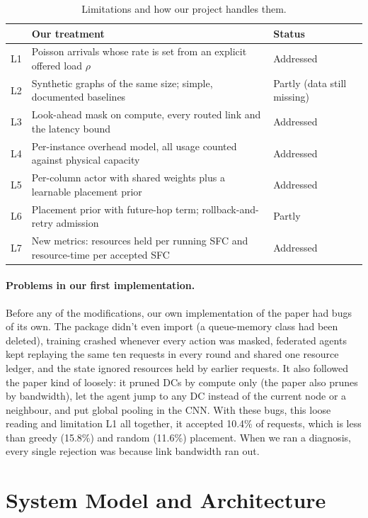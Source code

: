 \documentclass[11pt,a4paper]{article}
\newcommand{\ours}[1]{\textcolor[HTML]{1B7F5A}{#1}}
\begin{document}
\begin{table}[H]
\centering\small
\caption{Limitations and how our project handles them.}
\label{tab:limits}
\begin{tabularx}{\linewidth}{l X l}
\toprule
 & Our treatment & Status \\
\midrule
L1 & Poisson arrivals whose rate is set from an explicit offered load $\rho$ & \ours{Addressed} \\
L2 & Synthetic graphs of the same size; simple, documented baselines & Partly (data still missing) \\
L3 & Look-ahead mask on compute, every routed link and the latency bound & \ours{Addressed} \\
L4 & Per-instance overhead model, all usage counted against physical capacity & \ours{Addressed} \\
L5 & Per-column actor with shared weights plus a learnable placement prior & \ours{Addressed} \\
L6 & Placement prior with future-hop term; rollback-and-retry admission & Partly \\
L7 & New metrics: resources held per running SFC and resource-time per accepted SFC & \ours{Addressed} \\
\bottomrule
\end{tabularx}
\end{table}

\paragraph{Problems in our first implementation.} Before any of the
modifications, our own implementation of the paper had bugs of its own. The
package didn't even import (a queue-memory class had been deleted), training
crashed whenever every action was masked, federated agents kept replaying the
same ten requests in every round and shared one resource ledger, and the state
ignored resources held by earlier requests. It also followed the paper kind of
loosely: it pruned DCs by compute only (the paper also prunes by bandwidth), let
the agent jump to any DC instead of the current node or a neighbour, and put
global pooling in the CNN. With these bugs, this loose reading and limitation
L1 all together, it accepted 10.4\% of requests, which is less than greedy
(15.8\%) and random (11.6\%) placement. When we ran a diagnosis, every single
rejection was because link bandwidth ran out.

\section{System Model and Architecture}
\end{document}
